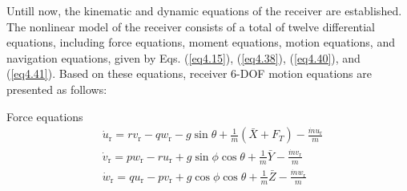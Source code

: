 Untill now, the kinematic and dynamic equations of the receiver are established. The nonlinear model of the receiver consists of a total of twelve differential equations, including force equations, moment equations, motion equations, and navigation equations, given by Eqs. (\ref{eq4.15}), (\ref{eq4.38}), (\ref{eq4.40}), and (\ref{eq4.41}). Based on these equations, receiver 6-DOF motion equations are presented as follows:

Force equations 
\begin{equation}\label{eq4.42}
\begin{aligned}
& \dot{u}_{\mathrm{r}}=r v_{\mathrm{r}}-q w_{\mathrm{r}}-g \sin \theta+\frac{1}{m}\left(\bar{X}+F_T\right)-\frac{\dot{m} u_{\mathrm{r}}}{m} \\
& \dot{v}_{\mathrm{r}}=p w_{\mathrm{r}}-r u_{\mathrm{r}}+g \sin \phi \cos \theta+\frac{1}{m} \bar{Y}-\frac{\dot{m} v_{\mathrm{r}}}{m} \\
& \dot{w}_{\mathrm{r}}=q u_{\mathrm{r}}-p v_{\mathrm{r}}+g \cos \phi \cos \theta+\frac{1}{m} \bar{Z}-\frac{\dot{m} w_{\mathrm{r}}}{m}
\end{aligned}
\end{equation}

